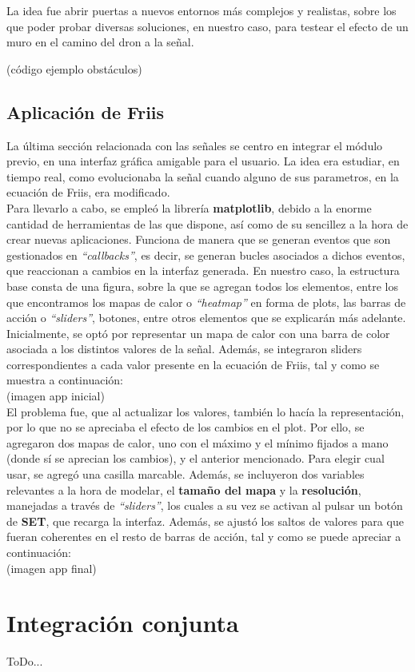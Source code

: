 La idea fue abrir puertas a nuevos entornos más complejos y realistas, sobre los que poder probar diversas soluciones, en nuestro caso, para testear el efecto de un muro en el camino del dron a la señal.

(código ejemplo obstáculos)\\

\subsection{Aplicación de Friis}
\label{subsec:friis-app}

La última sección relacionada con las señales se centro en integrar el módulo previo, en una interfaz gráfica amigable para el usuario. La idea era estudiar, en tiempo real, como evolucionaba la señal cuando alguno de sus parametros, en la ecuación de Friis, era modificado.\\

Para llevarlo a cabo, se empleó la librería \textbf{matplotlib}, debido a la enorme cantidad de herramientas de las que dispone, así como de su sencillez a la hora de crear nuevas aplicaciones. Funciona de manera que se generan eventos que son gestionados en \emph{``callbacks''}, es decir, se generan bucles asociados a dichos eventos, que reaccionan a cambios en la interfaz generada. En nuestro caso, la estructura base consta de una figura, sobre la que se agregan todos los elementos, entre los que encontramos los mapas de calor o \emph{``heatmap''} en forma de plots, las barras de acción o \emph{``sliders''}, botones, entre otros elementos que se explicarán más adelante.\\

Inicialmente, se optó por representar un mapa de calor con una barra de color asociada a los distintos valores de la señal. Además, se integraron sliders correspondientes a cada valor presente en la ecuación de Friis, tal y como se muestra a continuación:\\

(imagen app inicial)\\

El problema fue, que al actualizar los valores, también lo hacía la representación, por lo que no se apreciaba el efecto de los cambios en el plot. Por ello, se agregaron dos mapas de calor, uno con el máximo y el mínimo fijados a mano (donde sí se aprecian los cambios), y el anterior mencionado. Para elegir cual usar, se agregó una casilla marcable. Además, se incluyeron dos variables relevantes a la hora de modelar, el \textbf{tamaño del mapa} y la \textbf{resolución}, manejadas a través de \emph{``sliders''}, los cuales a su vez se activan al pulsar un botón de \textbf{SET}, que recarga la interfaz. Además, se ajustó los saltos de valores para que fueran coherentes en el resto de barras de acción, tal y como se puede apreciar a continuación:\\

(imagen app final)\\

\section{Integración conjunta}
\label{sec:integration}

ToDo...